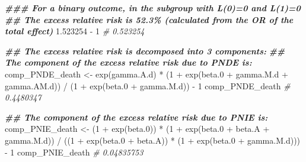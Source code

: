 \documentclass[
]{book}
\newenvironment{Shaded}{\begin{snugshade}}{\end{snugshade}}
\newcommand{\CommentTok}[1]{\textcolor[rgb]{0.56,0.35,0.01}{\textit{#1}}}
\newcommand{\DecValTok}[1]{\textcolor[rgb]{0.00,0.00,0.81}{#1}}
\newcommand{\DocumentationTok}[1]{\textcolor[rgb]{0.56,0.35,0.01}{\textbf{\textit{#1}}}}
\newcommand{\FloatTok}[1]{\textcolor[rgb]{0.00,0.00,0.81}{#1}}
\newcommand{\FunctionTok}[1]{\textcolor[rgb]{0.00,0.00,0.00}{#1}}
\newcommand{\NormalTok}[1]{#1}
\newcommand{\OtherTok}[1]{\textcolor[rgb]{0.56,0.35,0.01}{#1}}
\newcommand{\SpecialCharTok}[1]{\textcolor[rgb]{0.00,0.00,0.00}{#1}}
\begin{document}
\begin{Shaded}
\begin{Highlighting}[]
\DocumentationTok{\#\#\# For a binary outcome, in the subgroup with L(0)=0 and L(1)=0}
\DocumentationTok{\#\# The excess relative risk is 52.3\% (calculated from the OR of the total effect)}
\FloatTok{1.523254} \SpecialCharTok{{-}} \DecValTok{1}
\CommentTok{\# 0.523254}

\DocumentationTok{\#\# The excess relative risk is decomposed into 3 components:}
\DocumentationTok{\#\# The component of the excess relative risk due to PNDE is:}
\NormalTok{comp\_PNDE\_death }\OtherTok{\textless{}{-}} \FunctionTok{exp}\NormalTok{(gamma.A.d) }\SpecialCharTok{*}\NormalTok{ (}\DecValTok{1} \SpecialCharTok{+} \FunctionTok{exp}\NormalTok{(beta}\FloatTok{.0} \SpecialCharTok{+}\NormalTok{ gamma.M.d }\SpecialCharTok{+}\NormalTok{ gamma.AM.d)) }\SpecialCharTok{/}
\NormalTok{  (}\DecValTok{1} \SpecialCharTok{+} \FunctionTok{exp}\NormalTok{(beta}\FloatTok{.0} \SpecialCharTok{+}\NormalTok{ gamma.M.d)) }\SpecialCharTok{{-}} \DecValTok{1}
\NormalTok{comp\_PNDE\_death}
\CommentTok{\# 0.4480347 }

\DocumentationTok{\#\# The component of the excess relative risk due to PNIE is:}
\NormalTok{comp\_PNIE\_death }\OtherTok{\textless{}{-}}\NormalTok{ (}\DecValTok{1} \SpecialCharTok{+} \FunctionTok{exp}\NormalTok{(beta}\FloatTok{.0}\NormalTok{)) }\SpecialCharTok{*}\NormalTok{ (}\DecValTok{1} \SpecialCharTok{+} \FunctionTok{exp}\NormalTok{(beta}\FloatTok{.0} \SpecialCharTok{+}\NormalTok{ beta.A }\SpecialCharTok{+}\NormalTok{ gamma.M.d)) }\SpecialCharTok{/}
\NormalTok{  ((}\DecValTok{1} \SpecialCharTok{+} \FunctionTok{exp}\NormalTok{(beta}\FloatTok{.0} \SpecialCharTok{+}\NormalTok{ beta.A)) }\SpecialCharTok{*}\NormalTok{ (}\DecValTok{1} \SpecialCharTok{+} \FunctionTok{exp}\NormalTok{(beta}\FloatTok{.0} \SpecialCharTok{+}\NormalTok{ gamma.M.d))) }\SpecialCharTok{{-}} \DecValTok{1}
\NormalTok{comp\_PNIE\_death}
\CommentTok{\# 0.04835753}


\end{Highlighting}
\end{Shaded}
\end{document}
